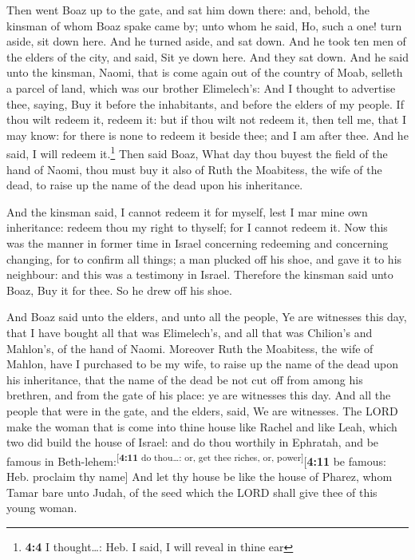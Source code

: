  Then went Boaz up to the gate, and sat him down there:
and, behold, the kinsman of whom Boaz spake came by; unto whom he said,
Ho, such a one! turn aside, sit down here. And he turned aside, and sat
down.  And he took ten men of the elders of the city, and
said, Sit ye down here. And they sat down.  And he said
unto the kinsman, Naomi, that is come again out of the country of Moab,
selleth a parcel of land, which was our brother Elimelech's:
 And I thought to advertise thee, saying, Buy it before
the inhabitants, and before the elders of my people. If thou wilt redeem
it, redeem it: but if thou wilt not redeem it, then tell me, that I may
know: for there is none to redeem it beside thee; and I am after thee.
And he said, I will redeem it.\footnote{\textbf{4:4} I thought\ldots:
  Heb. I said, I will reveal in thine ear}  Then said
Boaz, What day thou buyest the field of the hand of Naomi, thou must buy
it also of Ruth the Moabitess, the wife of the dead, to raise up the
name of the dead upon his inheritance.

 And the kinsman said, I cannot redeem it for myself, lest
I mar mine own inheritance: redeem thou my right to thyself; for I
cannot redeem it.  Now this was the manner in former time
in Israel concerning redeeming and concerning changing, for to confirm
all things; a man plucked off his shoe, and gave it to his neighbour:
and this was a testimony in Israel.  Therefore the kinsman
said unto Boaz, Buy it for thee. So he drew off his shoe.

 And Boaz said unto the elders, and unto all the people,
Ye are witnesses this day, that I have bought all that was Elimelech's,
and all that was Chilion's and Mahlon's, of the hand of Naomi.
 Moreover Ruth the Moabitess, the wife of Mahlon, have I
purchased to be my wife, to raise up the name of the dead upon his
inheritance, that the name of the dead be not cut off from among his
brethren, and from the gate of his place: ye are witnesses this day.
 And all the people that were in the gate, and the
elders, said, We are witnesses. The LORD make the woman that is come
into thine house like Rachel and like Leah, which two did build the
house of Israel: and do thou worthily in Ephratah, and be famous in
Beth-lehem:\textsuperscript{{[}\textbf{4:11} do thou\ldots: or, get thee
riches, or, power{]}}{[}\textbf{4:11} be famous: Heb. proclaim thy
name{]}  And let thy house be like the house of Pharez,
whom Tamar bare unto Judah, of the seed which the LORD shall give thee
of this young woman.


